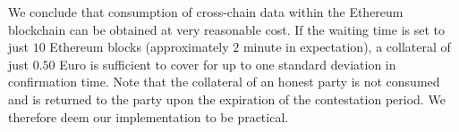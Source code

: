 We conclude that consumption of cross-chain data within the Ethereum blockchain
can be obtained at very reasonable cost. If the waiting time is set to just
$10$ Ethereum blocks (approximately $2$ minute in expectation), a collateral of
just $0.50$ Euro is sufficient to cover for up to one standard deviation in
confirmation time. Note that the collateral of an honest party is not consumed
and is returned to the party upon the expiration of the contestation period. We
therefore deem our implementation to be practical.

